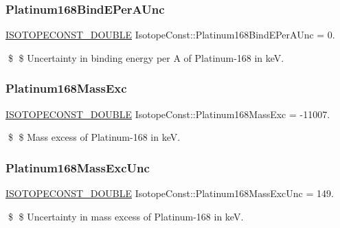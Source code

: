 \subsubsection{\texorpdfstring{Platinum168\+Bind\+E\+Per\+A\+Unc}{Platinum168BindEPerAUnc}}
{\footnotesize\ttfamily \mbox{\hyperlink{group___isotope_const-_macros_ga8f45a7272ce02c0b4c65c44636ed719a}{I\+S\+O\+T\+O\+P\+E\+C\+O\+N\+S\+T\+\_\+\+D\+O\+U\+B\+LE}} Isotope\+Const\+::\+Platinum168\+Bind\+E\+Per\+A\+Unc = 0.}

\$ \$ Uncertainty in binding energy per A of Platinum-\/168 in keV. \mbox{\label{group___isotope_const-_platinum-_pt168_ga24c53773409b5d7ad7027ba3bea93b4e}} 
\subsubsection{\texorpdfstring{Platinum168\+Mass\+Exc}{Platinum168MassExc}}
{\footnotesize\ttfamily \mbox{\hyperlink{group___isotope_const-_macros_ga8f45a7272ce02c0b4c65c44636ed719a}{I\+S\+O\+T\+O\+P\+E\+C\+O\+N\+S\+T\+\_\+\+D\+O\+U\+B\+LE}} Isotope\+Const\+::\+Platinum168\+Mass\+Exc = -\/11007.}

\$ \$ Mass excess of Platinum-\/168 in keV. \mbox{\label{group___isotope_const-_platinum-_pt168_gafba52561accd77620d30a6753743724e}} 
\subsubsection{\texorpdfstring{Platinum168\+Mass\+Exc\+Unc}{Platinum168MassExcUnc}}
{\footnotesize\ttfamily \mbox{\hyperlink{group___isotope_const-_macros_ga8f45a7272ce02c0b4c65c44636ed719a}{I\+S\+O\+T\+O\+P\+E\+C\+O\+N\+S\+T\+\_\+\+D\+O\+U\+B\+LE}} Isotope\+Const\+::\+Platinum168\+Mass\+Exc\+Unc = 149.}

\$ \$ Uncertainty in mass excess of Platinum-\/168 in keV. \mbox{\label{group___isotope_const-_platinum-_pt168_ga0fc339b1141f567ad0ac1f5af41e4908}} 
